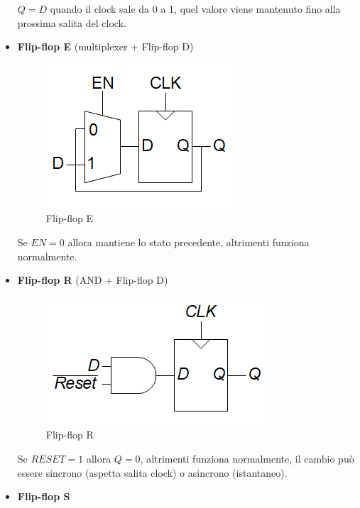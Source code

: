 \documentclass{article}
\begin{document}
\begin{itemize}
    $Q = D$ quando il clock sale da 0 a 1, quel valore viene mantenuto fino alla prossima salita del clock.

    \newpage

    \item \textbf{Flip-flop E} (multiplexer + Flip-flop D)

    \begin{figure}[ht]
        \centering
        \includegraphics[width=0.5\linewidth]{ffE.png}
        \caption{Flip-flop E}
        \label{fig:ff_E}
    \end{figure}

    Se $EN = 0$ allora mantiene lo stato precedente, altrimenti funziona normalmente.

    \vspace{5pt}

    \item \textbf{Flip-flop R} (AND + Flip-flop D)

    \begin{figure}[ht]
        \centering
        \includegraphics[width=0.6\linewidth]{ffR.png}
        \caption{Flip-flop R}
        \label{fig:ff_R}
    \end{figure}

    Se $RESET = 1$ allora $Q=0$, altrimenti funziona normalmente, il cambio può essere sincrono (aspetta salita clock) o asincrono (istantaneo).

    \newpage

    \item \textbf{Flip-flop S }


\end{itemize}
\end{document}
